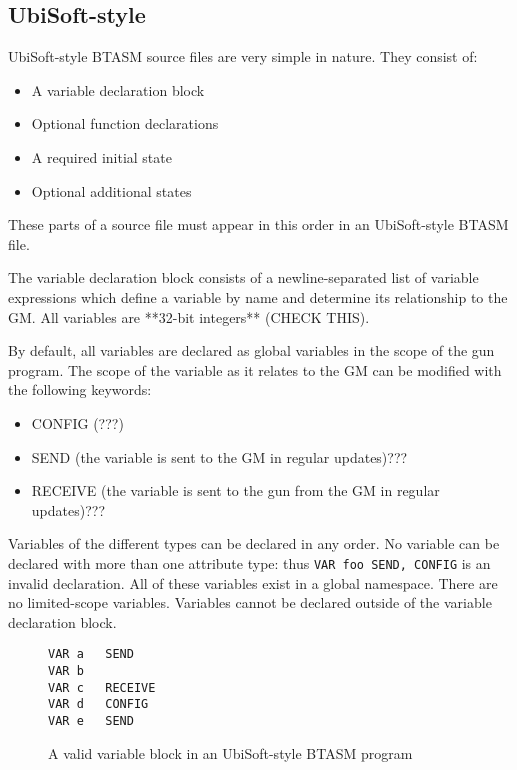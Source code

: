 \documentclass[12pt]{scrbook}
\begin{document}
\subsection{UbiSoft-style}
UbiSoft-style BTASM source files are very simple in nature.  They consist of:
\begin{itemize} 
\item A variable declaration block
\item Optional function declarations
\item A required initial state
\item Optional additional states
\end{itemize}

These parts of a source file must appear in this order in an UbiSoft-style BTASM file.  

The variable declaration block consists of a newline-separated list of variable expressions
which define a variable by name and determine its relationship to the GM.  All variables are 
**32-bit integers** (CHECK THIS).  

By default, all variables are declared as global variables in the scope of the gun program.
The scope of the variable as it relates to the GM can be modified with the following keywords:
\begin{itemize}
\item CONFIG (???)
\item SEND (the variable is sent to the GM in regular updates)???
\item RECEIVE (the variable is sent to the gun from the GM in regular updates)???
\end{itemize}

Variables of the different types can be declared in any order.  No variable can be declared
with more than one attribute type: thus \lstinline|VAR foo SEND, CONFIG| is an invalid
declaration.  All of these variables exist in a global namespace.  There are no limited-scope 
variables.  Variables cannot be declared outside of the variable declaration block.  

\begin{figure}[h]
\begin{lstlisting}
VAR a	SEND
VAR b
VAR c   RECEIVE
VAR d	CONFIG
VAR e	SEND
\end{lstlisting}
\caption{A valid variable block in an UbiSoft-style BTASM program} 
\end{figure}

\ \\
\end{document}
